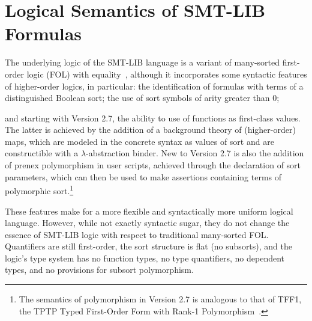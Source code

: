 



\chapter{Logical Semantics of SMT-LIB Formulas} \label{chap:logical-semantics}
\thispagestyle{empty}

The underlying logic of the SMT-LIB language is a variant of many-sorted 
first-order logic (FOL) with equality~\cite{Man-MSL-93,Gal-86,Hen-01},
although it incorporates some syntactic  features 
of higher-order logics, in particular: 
the identification of formulas with terms of a distinguished Boolean sort;
the use of sort symbols of arity greater than 0;
\begin{newver}
and starting with Version 2.7, the ability to use of functions as first-class values.
The latter is achieved by the addition of a background theory of (higher-order) maps,
which are modeled in the concrete syntax as values 
of sort 
and are constructible with a $\lambda$-abstraction binder.
New to Version 2.7 is also the addition of prenex polymorphism in user scripts,
achieved through the declaration of sort parameters, which can then 
be used to make assertions containing terms of polymorphic sort.\footnote{
The semantics of polymorphism in Version 2.7 is analogous to that of TFF1, the TPTP Typed First-Order Form with Rank-1 Polymorphism~\cite{BlanchetteP13}.
}
\end{newver}

These features make for a more flexible and syntactically more uniform 
logical language.
However, while not exactly syntactic sugar, they do not change the essence 
of SMT-LIB logic with respect to traditional many-sorted FOL.
Quantifiers are still first-order, the sort structure is flat (no subsorts),
and the logic's type system has no function types, 
no type quantifiers, no dependent types, and
no provisions for subsort polymorphism.

